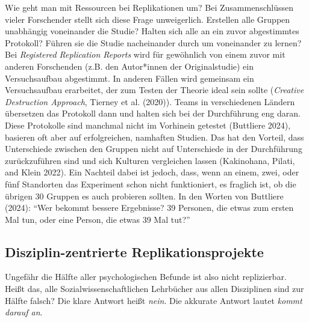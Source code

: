 \documentclass[
  letterpaper,
  DIV=11,
  numbers=noendperiod]{scrreprt}
\begin{document}
\begin{tcolorbox}[enhanced jigsaw, left=2mm, colback=white, colframe=quarto-callout-note-color-frame, opacitybacktitle=0.6, opacityback=0, title=\textcolor{quarto-callout-note-color}{\faInfo}\hspace{0.5em}{Effiziente Nutzung von Ressourcen?}, toptitle=1mm, coltitle=black, colbacktitle=quarto-callout-note-color!10!white, titlerule=0mm, bottomtitle=1mm, leftrule=.75mm, breakable, rightrule=.15mm, bottomrule=.15mm, toprule=.15mm, arc=.35mm]

Wie geht man mit Ressourcen bei Replikationen um? Bei Zusammenschlüssen
vieler Forschender stellt sich diese Frage unweigerlich. Erstellen alle
Gruppen unabhängig voneinander die Studie? Halten sich alle an ein zuvor
abgestimmtes Protokoll? Führen sie die Studie nacheinander durch um
voneinander zu lernen? Bei \emph{Registered Replication Reports} wird
für gewöhnlich von einem zuvor mit anderen Forschenden (z.B. den
Autor*innen der Originalstudie) ein Versuchsaufbau abgestimmt. In
anderen Fällen wird gemeinsam ein Versuchsaufbau erarbeitet, der zum
Testen der Theorie ideal sein sollte (\emph{Creative Destruction
Approach}, Tierney et al. (2020)). Teams in verschiedenen Ländern
übersetzen das Protokoll dann und halten sich bei der Durchführung eng
daran. Diese Protokolle sind manchmal nicht im Vorhinein getestet
(Buttliere 2024), basieren oft aber auf erfolgreichen, namhaften
Studien. Das hat den Vorteil, dass Unterschiede zwischen den Gruppen
nicht auf Unterschiede in der Durchführung zurückzuführen sind und sich
Kulturen vergleichen lassen (Kakinohana, Pilati, and Klein 2022). Ein
Nachteil dabei ist jedoch, dass, wenn an einem, zwei, oder fünf
Standorten das Experiment schon nicht funktioniert, es fraglich ist, ob
die übrigen 30 Gruppen es auch probieren sollten. In den Worten von
Buttliere (2024): ``Wer bekommt bessere Ergebnisse? 39 Personen, die
etwas zum ersten Mal tun, oder eine Person, die etwas 39 Mal tut?''

\end{tcolorbox}

\subsection{Disziplin-zentrierte
Replikationsprojekte}\label{disziplin-zentrierte-replikationsprojekte}

Ungefähr die Hälfte aller psychologischen Befunde ist also nicht
replizierbar. Heißt das, alle Sozialwissenschaftlichen Lehrbücher aus
allen Disziplinen sind zur Hälfte falsch? Die klare Antwort heißt
\emph{nein}. Die akkurate Antwort lautet \emph{kommt darauf an}.
\end{document}
